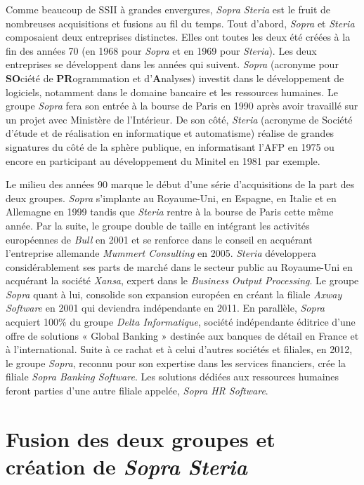 \documentclass{polytech/polytech}
\begin{document}
Comme beaucoup de SSII à grandes envergures, \textit{Sopra Steria} est le fruit de nombreuses acquisitions et fusions au fil du temps. Tout d'abord, \textit{Sopra} et \textit{Steria} composaient deux entreprises distinctes. Elles ont toutes les deux été créées à la fin des années 70 (en 1968 pour \textit{Sopra} et en 1969 pour \textit{Steria}). Les deux entreprises se développent dans les années qui suivent. \textit{Sopra} (acronyme pour \textbf{SO}ciété de \textbf{PR}ogrammation et d'\textbf{A}nalyses) investit dans le développement de logiciels, notamment dans le domaine bancaire et les ressources humaines. Le groupe \textit{Sopra} fera son entrée à la bourse de Paris en 1990 après avoir travaillé sur un projet avec Ministère de l'Intérieur. De son côté, \textit{Steria} (acronyme de Société d'étude et de réalisation en informatique et automatisme) réalise de grandes signatures du côté de la sphère publique, en informatisant l'AFP en 1975 ou encore en participant au développement du Minitel en 1981 par exemple. 

Le milieu des années 90 marque le début d'une série d'acquisitions de la part des deux groupes. \textit{Sopra} s'implante au Royaume-Uni, en Espagne, en Italie et en Allemagne en 1999 tandis que \textit{Steria} rentre à la bourse de Paris cette même année. Par la suite, le groupe double de taille en intégrant les activités européennes de \textit{Bull} en 2001 et se renforce dans le conseil en acquérant l'entreprise allemande \textit{Mummert Consulting} en 2005. \textit{Steria} développera considérablement ses parts de marché dans le secteur public au Royaume-Uni en acquérant la société \textit{Xansa}, expert dans le \textit{Business Output Processing}. Le groupe \textit{Sopra} quant à lui, consolide son expansion européen en créant la filiale \textit{Axway Software} en 2001 qui deviendra indépendante en 2011. En parallèle, \textit{Sopra} acquiert 100\% du groupe \textit{Delta Informatique}, société indépendante éditrice d'une offre de solutions « Global Banking » destinée aux banques de détail en France et à l’international. Suite à ce rachat et à celui d'autres sociétés et filiales, en 2012, le groupe \textit{Sopra}, reconnu pour son expertise dans les services financiers, crée la filiale \textit{Sopra Banking Software}. Les solutions dédiées aux ressources humaines feront parties d'une autre filiale appelée, \textit{Sopra HR Software}.

\section{Fusion des deux groupes et création de \textit{Sopra Steria}}
\end{document}
